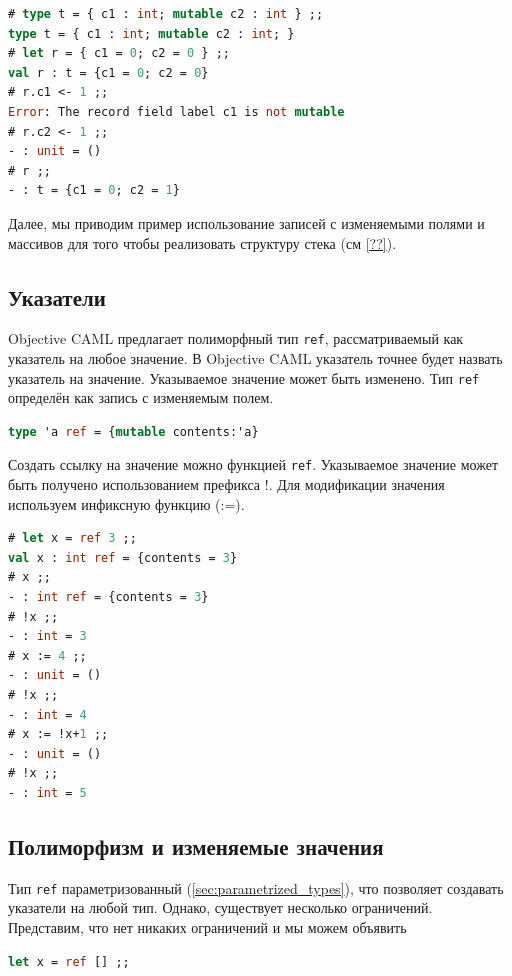 \begin{lstlisting}[language=OCaml]
# type t = { c1 : int; mutable c2 : int } ;;
type t = { c1 : int; mutable c2 : int; }
# let r = { c1 = 0; c2 = 0 } ;;
val r : t = {c1 = 0; c2 = 0}
# r.c1 <- 1 ;;
Error: The record field label c1 is not mutable
# r.c2 <- 1 ;;
- : unit = ()
# r ;;
- : t = {c1 = 0; c2 = 1}
\end{lstlisting}

Далее, мы приводим пример использование записей с изменяемыми полями и массивов
для того чтобы реализовать структуру стека (см \ref{??}).

\subsection{Указатели}

Objective CAML предлагает полиморфный тип \texttt{ref}, рассматриваемый как
указатель на любое значение. В Objective CAML указатель точнее будет назвать
указатель на значение. Указываемое значение может быть изменено. Тип
\texttt{ref} определён как запись с изменяемым полем.

\begin{lstlisting}[language=OCaml]
type 'a ref = {mutable contents:'a}
\end{lstlisting}

Создать ссылку на значение можно функцией \texttt{ref}. Указываемое значение
может быть получено использованием префикса !. Для модификации значения
используем инфиксную функцию (:=).

\begin{lstlisting}[language=OCaml]
# let x = ref 3 ;;
val x : int ref = {contents = 3}
# x ;;
- : int ref = {contents = 3}
# !x ;;
- : int = 3
# x := 4 ;;
- : unit = ()
# !x ;;
- : int = 4
# x := !x+1 ;;
- : unit = ()
# !x ;;
- : int = 5
\end{lstlisting}

\subsection{Полиморфизм и изменяемые значения}

Тип \texttt{ref} параметризованный (\ref{sec:parametrized_types}), что позволяет
создавать указатели на любой тип. Однако, существует несколько ограничений.
Представим, что нет никаких ограничений и мы можем объявить

\begin{lstlisting}[language=OCaml]
let x = ref [] ;;
\end{lstlisting}

